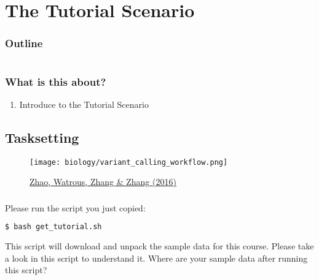 \section{The Tutorial Scenario}

\begin{frame}
    \frametitle{Outline}
    \begin{columns}[t]
        \begin{column}{.5\textwidth}
            \tableofcontents[sections={1-7},currentsection]
        \end{column}
        \begin{column}{.5\textwidth}
            \tableofcontents[sections={8-15},currentsection]
        \end{column}
    \end{columns}
\end{frame}

\begin{frame}
	\frametitle{What is this about?}
	\begin{docs}[Objective]
		\begin{enumerate}
			\item Introduce to the Tutorial Scenario 
		\end{enumerate}
	\end{docs}
\end{frame}

\subsection{Tasksetting}

\begin{frame}
  \begin{figure}
    \centering
    \texttt{[image: biology/variant\_calling\_workflow.png]}

    \smallskip

    \caption{\href{https://www.intechopen.com/chapters/53334}{Zhao, Watrous, Zhang \& Zhang (2016)}}
  \end{figure}
\end{frame}


\begin{frame}[fragile]
	\frametitle{}
	Please run the  script you just copied:
	\begin{lstlisting}[language=Bash, style=Shell,basicstyle=\footnotesize]
		$ bash get_tutorial.sh
	\end{lstlisting}
	\begin{task}
		This script will download and unpack the sample data for this course. Please take a look in this script to understand it. Where are your sample data after running this script?
	\end{task}
\end{frame}


